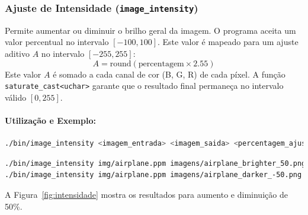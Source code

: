 \documentclass[a4paper, 11pt, portuguese]{article}
\begin{document}
\subsubsection{Ajuste de Intensidade (\texttt{image\_intensity})}
Permite aumentar ou diminuir o brilho geral da imagem. O programa aceita um valor percentual no intervalo $[-100, 100]$. Este valor é mapeado para um ajuste aditivo $A$ no intervalo $[-255, 255]$:
$$ A = \text{round}(\text{percentagem} \times 2.55) $$
Este valor $A$ é somado a cada canal de cor (B, G, R) de cada píxel. A função \texttt{saturate\_cast<uchar>} garante que o resultado final permaneça no intervalo válido $[0, 255]$.

\paragraph{Utilização e Exemplo:}
\begin{lstlisting}[language=bash, caption=Sintaxe de Uso do image\_intensity]
./bin/image_intensity <imagem_entrada> <imagem_saida> <percentagem_ajuste>
\end{lstlisting}
\begin{lstlisting}[language=bash]
./bin/image_intensity img/airplane.ppm imagens/airplane_brighter_50.png 50
./bin/image_intensity img/airplane.ppm imagens/airplane_darker_-50.png -50
\end{lstlisting}
A Figura~\ref{fig:intensidade} mostra os resultados para aumento e diminuição de 50\%.
\end{document}
